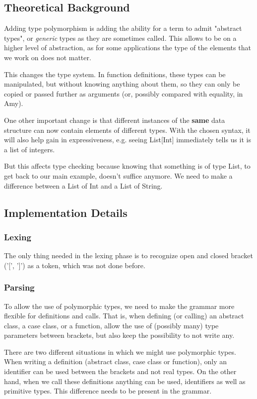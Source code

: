\subsection{Theoretical Background}

Adding type polymorphism is adding the ability for a term to admit "abstract types", or \emph{generic} types as they are sometimes called. This allows to be on a higher level of abstraction, as for some applications the type of the elements that we work on does not matter.

This changes the type system. In function definitions, these types can be manipulated, but without knowing anything about them, so they can only be copied or passed further as arguments (or, possibly compared with equality, in Amy).

One other important change is that different instances of the \textbf{same} data structure can now contain elements of different types. 
With the chosen syntax, it will also help gain in expressiveness, e.g. seeing List[Int] immediately tells us it is a list of integers.

But this affects type checking because knowing that something is of type List, to get back to our main example, doesn't suffice anymore. We need to make a difference between a List of Int and a List of String.

\subsection{Implementation Details}
\subsubsection{Lexing}
The only thing needed in the lexing phase is to recognize open and closed bracket ('[', ']') as a token, which was not done before.
\subsubsection{Parsing}
To allow the use of polymorphic types, we need to make the grammar more flexible for definitions and calls. That is, when defining (or calling) an abstract class, a case class, or a function, allow the use of (possibly many) type parameters between brackets, but also keep the possibility to not write any. 

There are two different situations in which we might use polymorphic types. When writing a definition (abstract class, case class or function), only an identifier can be used between the brackets and not real types. On the other hand, when we call these definitions anything can be used, identifiers as well as primitive types. This difference needs to be present in the grammar.

